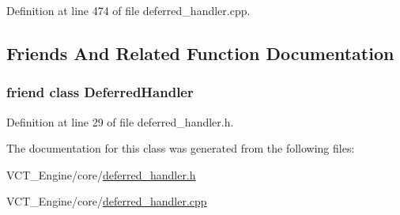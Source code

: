 Definition at line 474 of file deferred\+\_\+handler.\+cpp.



\subsection{Friends And Related Function Documentation}
\hypertarget{class_deferred_program_abb5b497d17b5687404e06c7d1390b4f8}{}
\subsubsection[{Deferred\+Handler}]{\setlength{\rightskip}{0pt plus 5cm}friend class {\bf Deferred\+Handler}\hspace{0.3cm}{\ttfamily [friend]}}\label{class_deferred_program_abb5b497d17b5687404e06c7d1390b4f8}


Definition at line 29 of file deferred\+\_\+handler.\+h.



The documentation for this class was generated from the following files\+:\begin{DoxyCompactItemize}
\item 
V\+C\+T\+\_\+\+Engine/core/\hyperlink{deferred__handler_8h}{deferred\+\_\+handler.\+h}\item 
V\+C\+T\+\_\+\+Engine/core/\hyperlink{deferred__handler_8cpp}{deferred\+\_\+handler.\+cpp}\end{DoxyCompactItemize}
